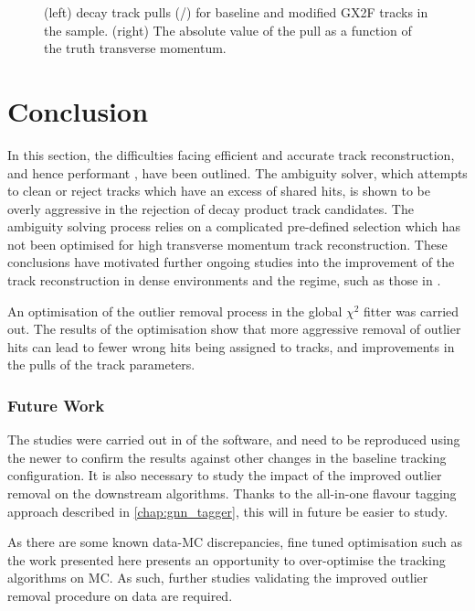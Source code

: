 \begin{figure}[!htbp]
\begin{subfigure}{.48\textwidth}
    \end{subfigure}
    \caption{
      (left) \bhadron decay track \dzero pulls (\dzero/\dzerosig) for baseline and modified GX2F tracks in the \Zprime sample. 
      (right) The absolute value of the \dzero pull as a function of the truth \bhadron transverse momentum.
    }
    \label{fig:gx2f_opt_pulls}
\end{figure}




\section{Conclusion}\label{sec:trk_btag_conclusion}

In this section, the difficulties facing efficient and accurate  track reconstruction, and hence performant \btagging, have been outlined.
The ambiguity solver, which attempts to clean or reject tracks which have an excess of shared hits, is shown to be overly aggressive in the rejection of \bhadron decay product track candidates.
The ambiguity solving process relies on a complicated pre-defined selection which has not been optimised for high transverse momentum \bhadron track reconstruction.
These conclusions have motivated further ongoing studies into the improvement of the track reconstruction in dense environments and the \highpt regime, such as those in .

An optimisation of the outlier removal process in the global $\chi^2$ fitter was carried out.
The results of the optimisation show that more aggressive removal of outlier hits can lead to fewer wrong hits being assigned to tracks, and improvements in the pulls of the track parameters.


\subsubsection{Future Work}
The studies were carried out in \rtwoone of the \ATLAS software, and need to be reproduced using the newer \rtwotwo to confirm the results against other changes in the baseline tracking configuration.
It is also necessary to study the impact of the improved outlier removal on the downstream \btagging algorithms.
Thanks to the all-in-one flavour tagging approach described in \cref{chap:gnn_tagger}, this will in future be easier to study.

As there are some known data-MC discrepancies, fine tuned optimisation such as the work presented here presents an opportunity to over-optimise the tracking algorithms on MC.
As such, further studies validating the improved outlier removal procedure on data are required.
